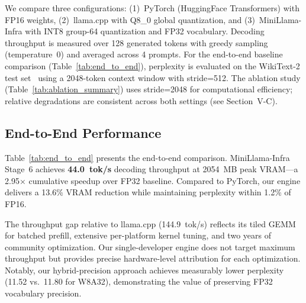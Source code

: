 \documentclass[conference]{IEEEtran}
\begin{document}
We compare three configurations: (1)~PyTorch (HuggingFace Transformers) with FP16 weights, (2)~llama.cpp with Q8\_0 global quantization, and (3)~MiniLlama-Infra with INT8 group-64 quantization and FP32 vocabulary. Decoding throughput is measured over 128 generated tokens with greedy sampling (temperature~0) and averaged across 4 prompts. For the end-to-end baseline comparison (Table~\ref{tab:end_to_end}), perplexity is evaluated on the WikiText-2 test set~\cite{merity2016wikitext} using a 2048-token context window with stride=512. The ablation study (Table~\ref{tab:ablation_summary}) uses stride=2048 for computational efficiency; relative degradations are consistent across both settings (see Section~V-C).

\subsection{End-to-End Performance}
Table~\ref{tab:end_to_end} presents the end-to-end comparison. MiniLlama-Infra Stage~6 achieves \textbf{44.0~tok/s} decoding throughput at 2054~MB peak VRAM---a 2.95$\times$ cumulative speedup over FP32 baseline. Compared to PyTorch, our engine delivers a 13.6\% VRAM reduction while maintaining perplexity within 1.2\% of FP16.

The throughput gap relative to llama.cpp (144.9~tok/s) reflects its tiled GEMM for batched prefill, extensive per-platform kernel tuning, and two years of community optimization. Our single-developer engine does not target maximum throughput but provides precise hardware-level attribution for each optimization. Notably, our hybrid-precision approach achieves measurably lower perplexity (11.52 vs.\ 11.80 for W8A32), demonstrating the value of preserving FP32 vocabulary precision.
\end{document}
